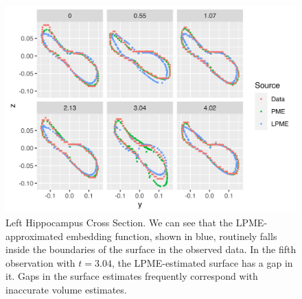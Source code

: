 \documentclass[11pt,reqno]{article}
\renewcommand{\textwidth}{180mm}
\theoremstyle{definition}
\begin{document}

\begin{figure}[h]
  \centering
  \includegraphics[height=8cm]{adni_plots/adni_cross_section}
  \caption{Left Hippocampus Cross Section. We can see that the LPME-approximated embedding function, shown in blue, routinely falls inside the boundaries of the surface in the observed data. In the fifth observation with $t=3.04$, the LPME-estimated surface has a gap in it. Gaps in the surface estimates frequently correspond with inaccurate volume estimates.}
  \label{fig:lhipp_cross_sections}
\end{figure}
\end{document}
